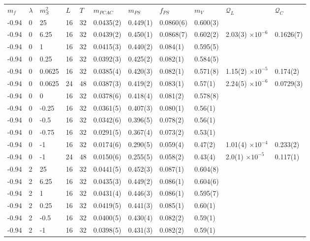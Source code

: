 \begin{table}
  \begin{adjustwidth}{-4em}{-4em}
  \begin{tabular}{l  l l l l l l l l l l}
  \toprule
  $m_f$ & $\lambda$ & $m_S^2$ & $L$ & $T$ & $m_{PCAC}$ & $m_{PS}$ & $f_{PS}$ & $m_V$ & $\mathcal Q_L$ & $\mathcal Q_C$ \\ 
  \hhline{===========}
  -0.94 & 0 & 25 & 16 & 32 & 0.0435(2) & 0.449(1) & 0.0860(6) & 0.600(3) \\
  -0.94 & 0 & 6.25 & 16 & 32 & 0.0439(2) & 0.450(1) & 0.0868(7) & 0.602(2) & 2.03(3) $\times 10^{-6}$ & 0.1626(7)\\
  -0.94 & 0 & 1 & 16 & 32 & 0.0415(3) & 0.440(2) & 0.084(1) & 0.595(5)\\
  -0.94 & 0 & 0.25 & 16 & 32 & 0.0392(3) & 0.425(2) & 0.082(1) & 0.584(5) \\
  -0.94 & 0 & 0.0625 & 16 & 32 & 0.0385(4) & 0.420(3) & 0.082(1) & 0.571(8) & 1.15(2) $\times 10^{-5}$ & 0.174(2)\\
  -0.94 & 0 & 0.0625 & 24 & 48 & 0.0387(3) & 0.419(2) & 0.083(1) & 0.57(1) &  2.24(5) $\times 10^{-6}$ & 0.0729(3)\\
  -0.94 & 0 & 0 & 16 & 32 & 0.0378(6) & 0.418(4) & 0.081(2) & 0.578(8)\\
  -0.94 & 0 & -0.25 & 16 & 32 & 0.0361(5) & 0.407(3) & 0.080(1) & 0.56(1)\\
  -0.94 & 0 & -0.5 & 16 & 32 & 0.0342(6) & 0.396(5) & 0.078(2) & 0.56(1)\\
  -0.94 & 0 & -0.75 & 16 & 32 & 0.0291(5) & 0.367(4) & 0.073(2) & 0.53(1)\\
  -0.94 & 0 & -1 & 16 & 32 & 0.0174(6) & 0.290(5) & 0.059(4) & 0.47(2) & 1.01(4) $\times 10^{-4}$ & 0.233(2)\\
  -0.94 & 0 & -1 & 24 & 48 & 0.0150(6) & 0.255(5) & 0.058(2) & 0.43(4) & 2.0(1) $\times 10^{-5}$ & 0.117(1)\\
  \midrule
  -0.94 & 2 & 25 & 16 & 32 & 0.0441(5) & 0.452(3) & 0.087(1) & 0.604(8)\\
  -0.94 & 2 & 6.25 & 16 & 32 & 0.0435(3) & 0.449(2) & 0.086(1) & 0.604(6)\\
  -0.94 & 2 & 1 & 16 & 32 & 0.0431(4) & 0.446(3) & 0.086(1) & 0.595(7)\\
  -0.94 & 2 & 0.25 & 16 & 32 & 0.0419(5) & 0.441(3) & 0.085(1) & 0.60(1) \\
  -0.94 & 2 & -0.5 & 16 & 32 & 0.0400(5) & 0.430(4) & 0.082(2) & 0.59(1)\\
  -0.94 & 2 & -1 & 16 & 32 & 0.0398(5) & 0.431(3) & 0.082(2) & 0.59(1)\\

\end{tabular}
\end{adjustwidth}
\end{table}

